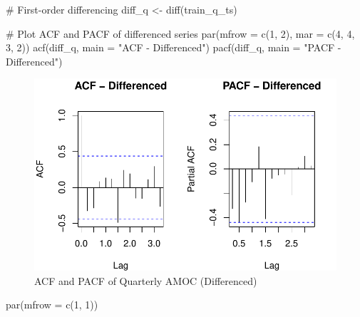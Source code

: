 \documentclass[
  11pt,
]{article}
\newenvironment{Shaded}{\begin{snugshade}}{\end{snugshade}}
\newcommand{\AttributeTok}[1]{\textcolor[rgb]{0.40,0.45,0.13}{#1}}
\newcommand{\CommentTok}[1]{\textcolor[rgb]{0.37,0.37,0.37}{#1}}
\newcommand{\DecValTok}[1]{\textcolor[rgb]{0.68,0.00,0.00}{#1}}
\newcommand{\FunctionTok}[1]{\textcolor[rgb]{0.28,0.35,0.67}{#1}}
\newcommand{\NormalTok}[1]{\textcolor[rgb]{0.00,0.23,0.31}{#1}}
\newcommand{\OtherTok}[1]{\textcolor[rgb]{0.00,0.23,0.31}{#1}}
\newcommand{\StringTok}[1]{\textcolor[rgb]{0.13,0.47,0.30}{#1}}
\begin{document}
\begin{Shaded}
\begin{Highlighting}[]
\CommentTok{\# First{-}order differencing}
\NormalTok{diff\_q }\OtherTok{\textless{}{-}} \FunctionTok{diff}\NormalTok{(train\_q\_ts)}

\CommentTok{\# Plot ACF and PACF of differenced series}
\FunctionTok{par}\NormalTok{(}\AttributeTok{mfrow =} \FunctionTok{c}\NormalTok{(}\DecValTok{1}\NormalTok{, }\DecValTok{2}\NormalTok{), }\AttributeTok{mar =} \FunctionTok{c}\NormalTok{(}\DecValTok{4}\NormalTok{, }\DecValTok{4}\NormalTok{, }\DecValTok{3}\NormalTok{, }\DecValTok{2}\NormalTok{))}
\FunctionTok{acf}\NormalTok{(diff\_q, }\AttributeTok{main =} \StringTok{"ACF {-} Differenced"}\NormalTok{)}
\FunctionTok{pacf}\NormalTok{(diff\_q, }\AttributeTok{main =} \StringTok{"PACF {-} Differenced"}\NormalTok{)}
\end{Highlighting}
\end{Shaded}

\begin{figure}[H]

{\centering \includegraphics{project_files/figure-pdf/fig-acf-pacf-quarterly-differenced-1.pdf}

}

\caption{ACF and PACF of Quarterly AMOC (Differenced)}

\end{figure}%

\begin{Shaded}
\begin{Highlighting}[]
\FunctionTok{par}\NormalTok{(}\AttributeTok{mfrow =} \FunctionTok{c}\NormalTok{(}\DecValTok{1}\NormalTok{, }\DecValTok{1}\NormalTok{))}
\end{Highlighting}
\end{Shaded}
\end{document}
